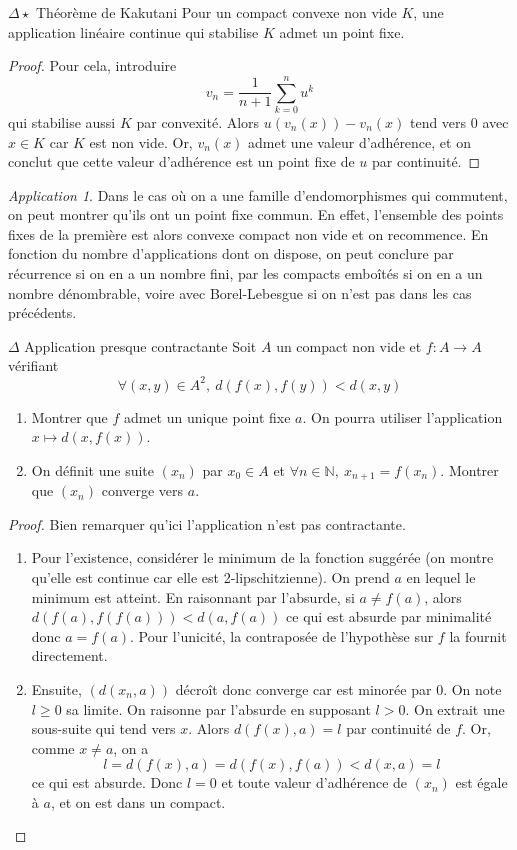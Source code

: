 \documentclass[french,a4paper]{article}
\newcommand{\N}{\mathbb{N}}
\theoremstyle{plain}
\theoremstyle{definition}
\theoremstyle{remark}
\newtheorem*{app}{Application}
\begin{document}
\begin{ex}[Moulin.26]{$\Delta\star$ Théorème de Kakutani} Pour un compact convexe non vide $K$, une application linéaire continue qui stabilise $K$ admet un point fixe.
\end{ex}
\begin{proof}
	Pour cela, introduire $$v_n=\frac{1}{n+1}\sum_{k=0}^{n}u^k$$ qui stabilise aussi $K$ par convexité. Alors $u(v_n(x))-v_n(x)$ tend vers $0$ avec $x\in K$ car $K$ est non vide. Or, $v_n(x)$ admet une valeur d'adhérence, et on conclut que cette valeur d'adhérence est un point fixe de $u$ par continuité.
\end{proof}
\begin{app}
	Dans le cas où on a une famille d'endomorphismes qui commutent, on peut montrer qu'ils ont un point fixe commun. En effet, l'ensemble des points fixes de la première est alors convexe compact non vide et on recommence. En fonction du nombre d'applications dont on dispose, on peut conclure par récurrence si on en a un nombre fini, par les compacts emboîtés si on en a un nombre dénombrable, voire avec Borel-Lebesgue si on n'est pas dans les cas précédents.
\end{app}

\begin{ex}[Moulin.27]{$\Delta$ Application presque contractante}
	Soit $A$ un compact non vide et $f:A\to A$ vérifiant $$\forall (x,y)\in A^2,\ d(f(x),f(y))<d(x,y)$$
	\begin{enumerate}
		\item Montrer que $f$ admet un unique point fixe $a$. On pourra utiliser l'application $x\mapsto d(x,f(x))$.
		\item On définit une suite $(x_n)$ par $x_0\in A$ et $\forall n\in\N,\ x_{n+1}=f(x_n)$. Montrer que $(x_n)$ converge vers $a$.
	\end{enumerate}
\end{ex}
\begin{proof}
	Bien remarquer qu'ici l'application n'est pas contractante.
	\begin{enumerate}
		\item Pour l'existence, considérer le minimum de la fonction suggérée (on montre qu'elle est continue car elle est 2-lipschitzienne). On prend $a$ en lequel le minimum est atteint. En raisonnant par l'absurde, si $a\ne f(a)$, alors $d(f(a),f(f(a)))<d(a,f(a))$ ce qui est absurde par minimalité donc $a=f(a)$. Pour l'unicité, la contraposée de l'hypothèse sur $f$ la fournit directement.
		\item Ensuite, $(d(x_n,a))$ décroît donc converge car est minorée par $0$. On note $l\geqslant 0$ sa limite. On raisonne par l'absurde en supposant $l>0$. On extrait une sous-suite qui tend vers $x$. Alors $d(f(x),a)=l$ par continuité de $f$. Or, comme $x\ne a$, on a $$l=d(f(x),a)=d(f(x),f(a))<d(x,a)=l$$ ce qui est absurde. Donc $l=0$ et toute valeur d'adhérence de $(x_n)$ est égale à $a$, et on est dans un compact.
	\end{enumerate}
\end{proof}
\end{document}
